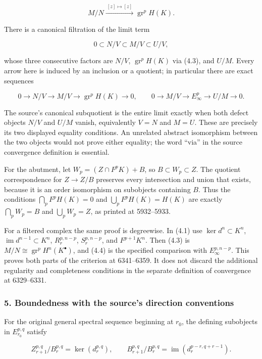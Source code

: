 \documentclass[11pt]{article}
\begin{document}
\[
M/N\xrightarrow{\ [z]\mapsto[z]\ }
\operatorname{gr}^pH(K).                  \tag{4.3}
\]

There is a canonical filtration of the limit term

\[
0\subset N/V\subset M/V\subset U/V,
\]

whose three consecutive factors are \(N/V\), \(\operatorname{gr}^pH(K)\) via (4.3), and \(U/M\). Every arrow here is induced by an inclusion or a quotient; in particular there are exact sequences

\[
0\to N/V\to M/V\to\operatorname{gr}^pH(K)\to0,
\qquad
0\to M/V\to E_\infty^p\to U/M\to0.          \tag{4.4}
\]

The source's canonical subquotient is the entire limit exactly when both defect objects \(N/V\) and \(U/M\) vanish, equivalently \(V=N\) and \(M=U\). These are precisely its two displayed equality conditions. An unrelated abstract isomorphism between the two objects would not prove either equality; the word ``via'' in the source convergence definition is essential.

For the abutment, let \(W_p=(Z\cap F^pK)+B\), so \(B\subset W_p\subset Z\). The quotient correspondence for \(Z\to Z/B\) preserves every intersection and union that exists, because it is an order isomorphism on subobjects containing \(B\). Thus the conditions \(\bigcap_pF^pH(K)=0\) and \(\bigcup_pF^pH(K)=H(K)\) are exactly \(\bigcap_pW_p=B\) and \(\bigcup_pW_p=Z\), as printed at 5932--5933.

For a filtered complex the same proof is degreewise. In (4.1) use \(\ker d^n\subset K^n\), \(\operatorname{im}d^{n-1}\subset K^n\), \(R_r^{p,n-p}\), \(S_r^{p,n-p}\), and \(F^{p+1}K^n\). Then (4.3) is \(M/N\cong\operatorname{gr}^pH^n(K^\bullet)\), and (4.4) is the specified comparison with \(E_\infty^{p,n-p}\). This proves both parts of the criterion at 6341--6359. It does not discard the additional regularity and completeness conditions in the separate definition of convergence at 6329--6331.

\subsubsection{5. Boundedness with the source's direction conventions}\label{boundedness-with-the-sources-direction-conventions}

For the original general spectral sequence beginning at \(r_0\), the defining subobjects in \(E_{r_0}^{p,q}\) satisfy

\[
Z_{r+1}^{p,q}/B_r^{p,q}=\ker(d_r^{p,q}),\qquad
B_{r+1}^{p,q}/B_r^{p,q}
=\operatorname{im}(d_r^{p-r,q+r-1}).
\]
\end{document}
